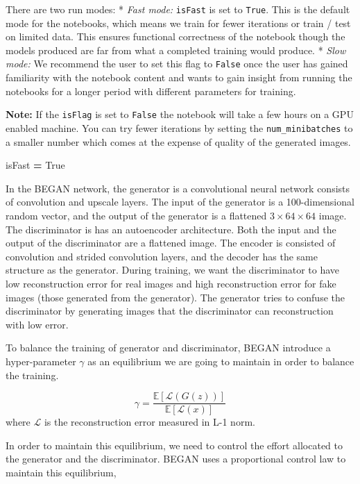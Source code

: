 \documentclass[]{book}
\newenvironment{Shaded}{\begin{snugshade}}{\end{snugshade}}
\newcommand{\VariableTok}[1]{\textcolor[rgb]{0.00,0.00,0.00}{#1}}
\newcommand{\OperatorTok}[1]{\textcolor[rgb]{0.81,0.36,0.00}{\textbf{#1}}}
\newcommand{\NormalTok}[1]{#1}
\theoremstyle{definition}
\theoremstyle{definition}
\theoremstyle{definition}
\theoremstyle{remark}
\begin{document}
There are two run modes: * \emph{Fast mode: } \texttt{isFast} is set to
\texttt{True}. This is the default mode for the notebooks, which means
we train for fewer iterations or train / test on limited data. This
ensures functional correctness of the notebook though the models
produced are far from what a completed training would produce. *
\emph{Slow mode: } We recommend the user to set this flag to
\texttt{False} once the user has gained familiarity with the notebook
content and wants to gain insight from running the notebooks for a
longer period with different parameters for training.

\textbf{Note: }If the \texttt{isFlag} is set to \texttt{False} the
notebook will take a few hours on a GPU enabled machine. You can try
fewer iterations by setting the \texttt{num\_minibatches} to a smaller
number which comes at the expense of quality of the generated images.

\begin{Shaded}
\begin{Highlighting}[]
\NormalTok{isFast }\OperatorTok{=} \VariableTok{True}
\end{Highlighting}
\end{Shaded}

In the BEGAN network, the generator is a convolutional neural network
consists of convolution and upscale layers. The input of the generator
is a 100-dimensional random vector, and the output of the generator is a
flattened \(3\times64\times64\) image. The discriminator is has an
autoencoder architecture. Both the input and the output of the
discriminator are a flattened image. The encoder is consisted of
convolution and strided convolution layers, and the decoder has the same
structure as the generator. During training, we want the discriminator
to have low reconstruction error for real images and high reconstruction
error for fake images (those generated from the generator). The
generator tries to confuse the discriminator by generating images that
the discriminator can reconstruction with low error.

To balance the training of generator and discriminator, BEGAN introduce
a hyper-parameter \(\gamma\) as an equilibrium we are going to maintain
in order to balance the training.

\[\gamma = \frac{\mathbb{E}[\mathcal{L}(G(z))]}{\mathbb{E}[\mathcal{L}(x)]}\]
where \(\mathcal{L}\) is the reconstruction error measured in L-1 norm.

In order to maintain this equilibrium, we need to control the effort
allocated to the generator and the discriminator. BEGAN uses a
proportional control law to maintain this equilibrium,
\end{document}
